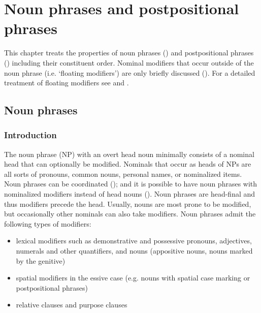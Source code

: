 \chapter{Noun phrases and postpositional phrases}
\label{cpt:Phrase structure}

This chapter treats the properties of noun phrases () and postpositional phrases () including their constituent order. Nominal modifiers that occur outside of the noun phrase (i.e. `floating modifiers') are only briefly discussed (). For a detailed treatment of floating modifiers see  and .


\section{Noun phrases}
\label{sec:Noun phrases}



\subsection{Introduction}
\label{ssec:IntroductionNP}

The noun phrase (NP) with an overt head noun minimally consists of a nominal head that can optionally be modified. Nominals that occur as heads of NPs are all sorts of pronouns, common nouns, personal names, or nominalized items. Noun phrases can be coordinated (); and it is possible to have noun phrases with nominalized modifiers instead of head nouns (). Noun phrases are head-final and thus modifiers precede the head. Usually, nouns are most prone to be modified, but occasionally other nominals can also take modifiers. Noun phrases admit the following types of modifiers:
%
\begin{itemize}
	\item	lexical modifiers such as demonstrative and possessive pronouns, adjectives, numerals and other quantifiers, and nouns (appositive nouns, nouns marked by the genitive)
	\item	spatial modifiers in the essive case (e.g. nouns with spatial case marking or postpositional phrases)
	\item	relative clauses and purpose clauses
\end{itemize}
%

